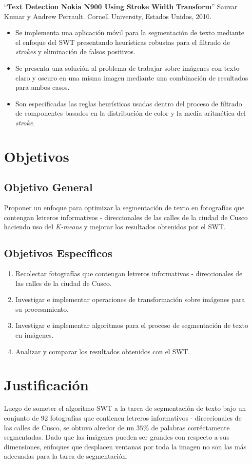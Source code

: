 ``\textbf{Text Detection Nokia N900 Using Stroke Width Transform}'' Sauvar Kumar
y Andrew Perrault. Cornell University, Estados Unidos,
2010.\cite{Saurav:SWT:2010}
\begin{itemize}
	\item Se implementa una aplicación móvil para la segmentación de texto
mediante el enfoque del SWT presentando heurísticas robustas para el filtrado 
de \textit{strokes} y eliminación de falsos positivos.
	\item Se presenta una solución al problema de trabajar sobre imágenes con
texto claro y oscuro en una misma imagen mediante una combinación de resultados
para ambos casos.
	\item Son especificadas las reglas heurísticas usadas dentro del proceso de
filtrado de componentes basados en la distribución de color y la media aritmética
del \textit{stroke}.
\end{itemize}

\section{Objetivos}
  \subsection{Objetivo General}
  Proponer un enfoque para optimizar la segmentación de texto en fotografías que
contengan letreros informativos - direccionales de las calles de la ciudad de
Cusco haciendo uso del \textit{K-means} y mejorar los resultados obtenidos por 
el SWT.
  \subsection{Objetivos Específicos}
  \begin{enumerate}
  	\item Recolectar fotografías que contengan letreros informativos -
direccionales de las calles de la ciudad de Cusco.
    \item Investigar e implementar operaciones de transformación sobre imágenes
para su procesamiento.
    \item Investigar e implementar algoritmos para el proceso de segmentación de
texto en imágenes.
    \item Analizar y comparar los resultados obtenidos con el SWT.
  \end{enumerate}

\section{Justificación}
	Luego de someter el algoritmo SWT a la tarea de segmentación de texto bajo un
conjunto de 92 fotografías que contienen letreros informativos - direccionales
de las calles de Cusco, se obtuvo alredor de un $35\%$ de palabras corréctamente
segmentadas. Dado que las imágenes pueden ser grandes con respecto a sus
dimensiones, enfoques que desplacen ventanas por toda la imagen no son las más
adecuadas para la tarea de segmentación. 
 
